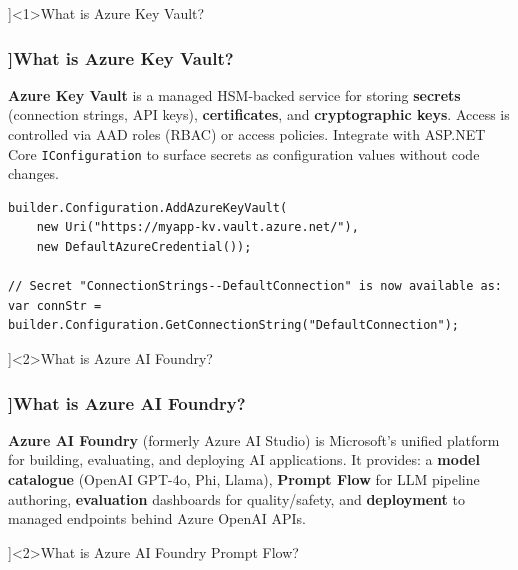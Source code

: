 \QuestionSlide[\CategoryBadge[AzureColor!20]{Azure}]<1>{What is Azure Key Vault?}

\begin{frame}[fragile]
  \frametitle{\AnswerTitle[\CategoryBadge[AzureColor!20]{Azure}]{What is Azure Key Vault?}}

  {\footnotesize
  \textbf{Azure Key Vault} is a managed HSM-backed service for storing \textbf{secrets} (connection strings, API keys), \textbf{certificates}, and \textbf{cryptographic keys}. Access is controlled via AAD roles (RBAC) or access policies. Integrate with ASP.NET Core \texttt{IConfiguration} to surface secrets as configuration values without code changes.
  }

  \begin{verbatim}
builder.Configuration.AddAzureKeyVault(
    new Uri("https://myapp-kv.vault.azure.net/"),
    new DefaultAzureCredential());

// Secret "ConnectionStrings--DefaultConnection" is now available as:
var connStr = builder.Configuration.GetConnectionString("DefaultConnection");
  \end{verbatim}
\end{frame}

\QuestionSlide[\CategoryBadge[AzureColor!20]{Azure}]<2>{What is Azure AI Foundry?}

\begin{frame}[fragile]
  \frametitle{\AnswerTitle[\CategoryBadge[AzureColor!20]{Azure}]{What is Azure AI Foundry?}}

  {\footnotesize
  \textbf{Azure AI Foundry} (formerly Azure AI Studio) is Microsoft's unified platform for building, evaluating, and deploying AI applications. It provides: a \textbf{model catalogue} (OpenAI GPT-4o, Phi, Llama), \textbf{Prompt Flow} for LLM pipeline authoring, \textbf{evaluation} dashboards for quality/safety, and \textbf{deployment} to managed endpoints behind Azure OpenAI APIs.
  }
\end{frame}

\QuestionSlide[\CategoryBadge[AzureColor!20]{Azure}]<2>{What is Azure AI Foundry Prompt Flow?}

